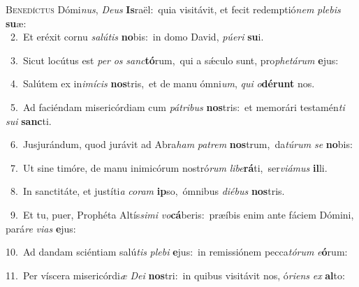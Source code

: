 \lettrine{\initial\textcolor{\initialcolor}{B}}{enedíctus} Dómi\-\textit{nus}\-, \textit{De}\-\textit{us} \textbf{Is}\-raël:~\star quia visitávit, et fecit redemptió\textit{nem} \textit{ple}\-\textit{bis} \textbf{su}\-æ:\\
{\numbfont\textcolor{\numbcolor}{~2.}}~Et eréxit cornu \textit{sa}\-\textit{lú}\textit{tis} \textbf{no}\-bis:~\star in domo David, \textit{pú}\-\textit{e}\textit{ri} \textbf{su}\-i.\par
{\numbfont\textcolor{\numbcolor}{~3.}}~Sicut locútus est \textit{per} \textit{os} \textit{sanc}\-\textbf{tó}rum,~\star qui a sǽculo sunt, pro\-\textit{phe}\-\textit{tá}\textit{rum} \textbf{e}\-jus:\par
{\numbfont\textcolor{\numbcolor}{~4.}}~Salútem ex in\-\textit{i}\-\textit{mí}\textit{cis} \textbf{nos}\-tris,~\star et de manu ómni\-\textit{um}\-, \textit{qui} \textit{o}\-\textbf{dé}\textbf{runt} nos.\par
{\numbfont\textcolor{\numbcolor}{~5.}}~Ad faciéndam misericórdiam cum \textit{pá}\-\textit{tri}\textit{bus} \textbf{nos}\-tris:~\star et memorári testamén\textit{ti} \textit{su}\-\textit{i} \textbf{sanc}\-ti.\par
{\numbfont\textcolor{\numbcolor}{~6.}}~Jusjurándum, quod jurávit ad Abra\textit{ham} \textit{pa}\-\textit{trem} \textbf{nos}\-trum,~\star da\-\textit{tú}\-\textit{rum} \textit{se} \textbf{no}\-bis:\par
{\numbfont\textcolor{\numbcolor}{~7.}}~Ut sine timóre, de manu inimicórum nostró\textit{rum} \textit{li}\-\textit{be}\textbf{rá}ti,~\star ser\-\textit{vi}\-\textit{á}\textit{mus} \textbf{il}\-li.\par
{\numbfont\textcolor{\numbcolor}{~8.}}~In sanctitáte, et justíti\textit{a} \textit{co}\-\textit{ram} \textbf{ip}\-so,~\star ómnibus \textit{di}\-\textit{é}\textit{bus} \textbf{nos}\-tris.\par
{\numbfont\textcolor{\numbcolor}{~9.}}~Et tu, puer, Prophéta Altís\-\textit{si}\-\textit{mi} \textit{vo}\-\textbf{cá}beris:~\star præíbis enim ante fáciem Dómini, pará\textit{re} \textit{vi}\-\textit{as} \textbf{e}\-jus:\par
{\numbfont\textcolor{\numbcolor}{10.}}~Ad dandam sciéntiam salú\textit{tis} \textit{ple}\-\textit{bi} \textbf{e}\-jus:~\star in remissiónem pecca\-\textit{tó}\-\textit{rum} \textit{e}\-\textbf{ó}rum:\par
{\numbfont\textcolor{\numbcolor}{11.}}~Per víscera misericórdi\textit{æ} \textit{De}\-\textit{i} \textbf{nos}\-tri:~\star in quibus visitávit nos, ó\-\textit{ri}\-\textit{ens} \textit{ex} \textbf{al}\-to:\par
